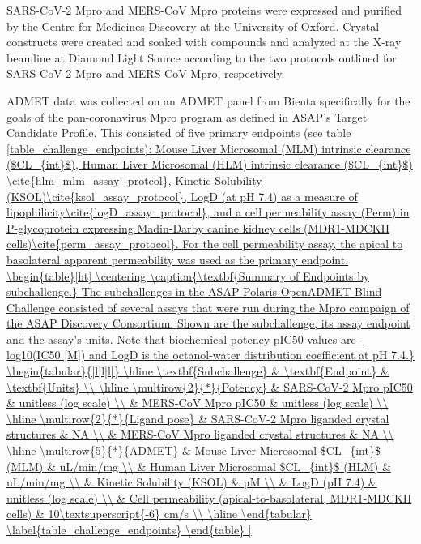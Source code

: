 \documentclass[journal=jcim,manuscript=article]{achemso}
\begin{document}
SARS-CoV-2 Mpro and MERS-CoV Mpro proteins were expressed and purified by the Centre for Medicines Discovery at the University of Oxford.\cite{wang_2025_mers, wang_2025_sars2} Crystal constructs were created and soaked with compounds and analyzed at the X-ray beamline at Diamond Light Source according to the two protocols outlined for SARS-CoV-2 Mpro\cite{sars_mpro_crystal_protocol} and MERS-CoV Mpro, respectively\cite{mers_mpro_crystal_protocol}. 

ADMET data was collected on an ADMET panel from Bienta specifically for the goals of the pan-coronavirus Mpro program as defined in ASAP’s Target Candidate Profile\cite{sars_mers_tcp}. This consisted of five primary endpoints (see table \ref{table_challenge_endpoints): Mouse Liver Microsomal (MLM) intrinsic clearance ($CL_{int}$), Human Liver Microsomal (HLM) intrinsic clearance ($CL_{int}$) \cite{hlm_mlm_assay_protcol}, Kinetic Solubility (KSOL)\cite{ksol_assay_protocol}, LogD (at pH 7.4) as a measure of lipophilicity\cite{logD_assay_protocol}, and a cell permeability assay (Perm) in P-glycoprotein expressing Madin-Darby canine kidney cells (MDR1-MDCKII cells)\cite{perm_assay_protocol}. For the cell permeability assay, the apical to basolateral apparent permeability was used as the primary endpoint.

\begin{table}[ht]
\centering
\caption{\textbf{Summary of Endpoints by subchallenge.} The subchallenges in the ASAP-Polaris-OpenADMET Blind Challenge consisted of several assays that were run during the Mpro campaign of the ASAP Discovery Consortium. Shown are the subchallenge, its assay endpoint and the assay's units. Note that biochemical potency pIC50 values are -log10(IC50 [M]) and LogD is the octanol-water distribution coefficient at pH 7.4.}
\begin{tabular}{|l|l|l|}
\hline
\textbf{Subchallenge} & \textbf{Endpoint} & \textbf{Units} \\
\hline
\multirow{2}{*}{Potency} 
& SARS-CoV-2 Mpro pIC50 & unitless (log scale) \\
& MERS-CoV Mpro pIC50    & unitless (log scale) \\
\hline
\multirow{2}{*}{Ligand pose} 
& SARS-CoV-2 Mpro liganded crystal structures & NA \\
& MERS-CoV Mpro liganded crystal structures   & NA \\
\hline
\multirow{5}{*}{ADMET} 
& Mouse Liver Microsomal $CL_{int}$ (MLM)  & uL/min/mg \\
& Human Liver Microsomal $CL_{int}$ (HLM)  & uL/min/mg \\
& Kinetic Solubility (KSOL)               & µM \\
& LogD (pH 7.4)                                    & unitless (log scale) \\
& Cell permeability (apical-to-basolateral, MDR1-MDCKII cells) & 10\textsuperscript{-6} cm/s \\
\hline
\end{tabular}
\label{table_challenge_endpoints}
\end{table}

}
\end{document}
